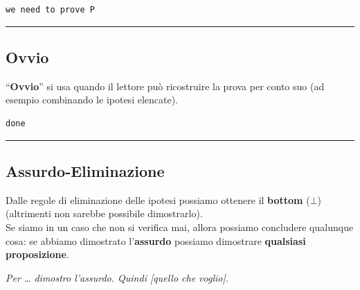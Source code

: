 \documentclass[
  a4paper,
]{article}
\begin{document}
\begin{examplebox}

\begin{lstlisting}
we need to prove P
\end{lstlisting}

\end{examplebox}

\par\noindent\rule{\linewidth}{0.4pt}\par\vspace{6pt}

\hypertarget{ovvio}{%
\subsection{Ovvio}\label{ovvio}}

``\textbf{Ovvio}'' si usa quando il lettore può ricostruire la prova per
conto suo (ad esempio combinando le ipotesi elencate).

\begin{examplebox}

\begin{lstlisting}
done
\end{lstlisting}

\end{examplebox}

\par\noindent\rule{\linewidth}{0.4pt}\par\vspace{6pt}

\hypertarget{assurdo-eliminazione}{%
\subsection{Assurdo-Eliminazione}\label{assurdo-eliminazione}}

Dalle regole di eliminazione delle ipotesi possiamo ottenere il
\textbf{bottom} (\(\bot\)) (altrimenti non sarebbe possibile
dimostrarlo).\\
Se siamo in un caso che non si verifica mai, allora possiamo concludere
qualunque cosa: se abbiamo dimostrato l'\textbf{assurdo} possiamo
dimostrare \textbf{qualsiasi proposizione}.

\begin{examplebox}[Esempio]

\emph{Per \ldots{} dimostro l'assurdo. Quindi {[}quello che voglio{]}.}

\end{examplebox}
\end{document}
